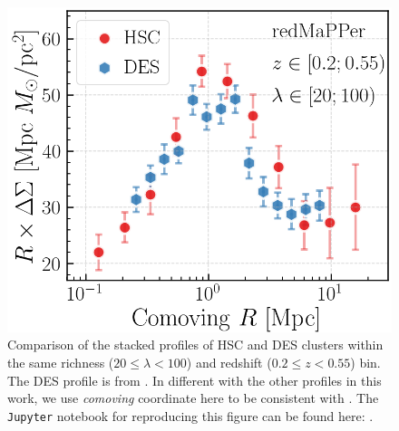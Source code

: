 \documentclass[fleqn,usenatbib,useAMS]{mnras}
\begin{document}
\begin{figure}
    \centering
    \includegraphics[width=\columnwidth]{figure/fig_G1}
    \caption{
        Comparison of the stacked \dsigma{} profiles of HSC and DES \redm{} clusters within 
        the same richness ($20 \leq \lambda < 100$) and redshift ($0.2 \leq z < 0.55$) bin.
        The DES \redm{} \dsigma{} profile is from \citet{Chang2018}.
        In different with the other \dsigma{} profiles in this work, we use \emph{comoving}
        coordinate here to be consistent with \citet{Chang2018}.
        The \texttt{Jupyter} notebook for reproducing this figure can be found here:
        \href{https://github.com/dr-guangtou/jianbing/blob/master/notebooks/figure/figG1.ipynb}{\faGithub}.
    }
    \label{fig:des_redm}
\end{figure}

\bsp
\label{lastpage}
\end{document}
